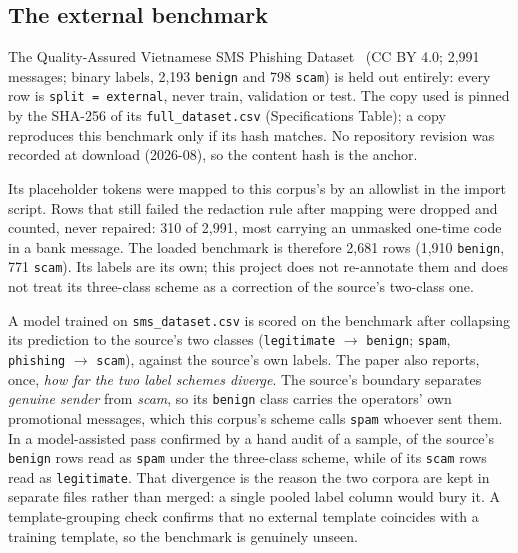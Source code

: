 \subsection*{The external benchmark}
The Quality-Assured Vietnamese SMS Phishing Dataset~\cite{qavn_sms} (CC BY 4.0; 2{,}991
messages; binary labels, 2{,}193 \texttt{benign} and 798 \texttt{scam}) is held out entirely:
every row is \texttt{split = external}, never train, validation or test. The copy used is
pinned by the SHA-256 of its \texttt{full\_dataset.csv} (Specifications Table); a copy
reproduces this benchmark only if its hash matches. No repository revision was recorded at
download (2026-08), so the content hash is the anchor.

Its placeholder tokens were mapped to this corpus's by an allowlist in the import script. Rows
that still failed the redaction rule after mapping were dropped and counted, never repaired:
310 of 2{,}991, most carrying an unmasked one-time code in a bank message. The loaded benchmark
is therefore 2{,}681 rows (1{,}910 \texttt{benign}, 771 \texttt{scam}). Its labels are its own;
this project does not re-annotate them and does not treat its three-class scheme as a
correction of the source's two-class one.

A model trained on \texttt{sms\_dataset.csv} is scored on the benchmark after collapsing its
prediction to the source's two classes (\texttt{legitimate} $\to$ \texttt{benign};
\texttt{spam}, \texttt{phishing} $\to$ \texttt{scam}), against the source's own labels. The
paper also reports, once, \emph{how far the two label schemes diverge}. The source's boundary
separates \emph{genuine sender} from \emph{scam}, so its \texttt{benign} class carries the
operators' own promotional messages, which this corpus's scheme calls \texttt{spam} whoever
sent them. In a model-assisted pass confirmed by a hand audit of a sample,  of
the source's \texttt{benign} rows read as \texttt{spam} under the three-class scheme, while
 of its \texttt{scam} rows read as \texttt{legitimate}. That divergence is the
reason the two corpora are kept in separate files rather than merged: a single pooled label
column would bury it. A template-grouping check confirms that no external template coincides
with a training template, so the benchmark is genuinely unseen.

